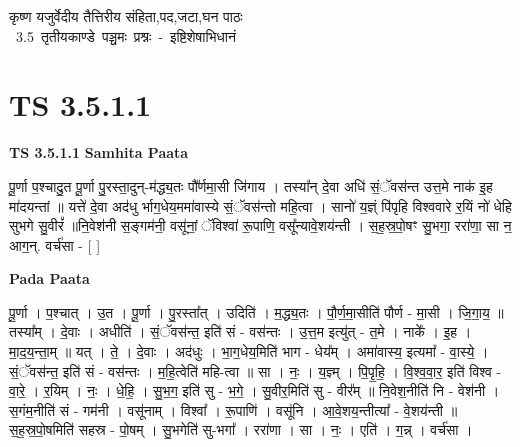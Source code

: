 \documentclass[17pt]{extarticle}
\begin{document}
\begin{titlepage}
    \begin{center}
 
\begin{sanskrit}
    { \Huge
    कृष्ण यजुर्वेदीय तैत्तिरीय संहिता,पद,जटा,घन पाठः 
    }
    \\
    \vspace{2.5cm}
    \mbox{ \Huge
    3.5      तृतीयकाण्डे पञ्चमः प्रश्नः - इष्टिशेषाभिधानं   }
\end{sanskrit}
\end{center}

\end{titlepage}
\tableofcontents
\pagebreak

\section*{ TS 3.5.1.1 }

\textbf{TS 3.5.1.1 } \newline
\textbf{Samhita Paata} \newline

पू॒र्णा प॒श्चादु॒त पू॒र्णा पु॒रस्ता॒दुन्-म॑द्ध्य॒तः पौ᳚र्णमा॒सी जि॑गाय । तस्या᳚न् दे॒वा अधि॑ सं॒ॅवस॑न्त उत्त॒मे नाक॑ इ॒ह मा॑दयन्तां ॥ यत्ते॑ दे॒वा अद॑धु र्भाग॒धेय॒ममा॑वास्ये सं॒ॅवस॑न्तो महि॒त्वा । सानो॑ य॒ज्ञ्ं पि॑पृहि विश्ववारे र॒यिं नो॑ धेहि सुभगे सु॒वीरं᳚ ॥नि॒वेश॑नी स॒ङ्गम॑नी॒ वसू॑नां॒ ॅविश्वा॑ रू॒पाणि॒ वसू᳚न्यावे॒शय॑न्ती । स॒ह॒स्र॒पो॒षꣳ सु॒भगा॒ ररा॑णा॒ सा न॒ आग॒न्. वर्च॑सा - [  ] \newline

\textbf{Pada Paata} \newline

पू॒र्णा । प॒श्चात् । उ॒त । पू॒र्णा । पु॒रस्ता᳚त् । उदिति॑ । म॒द्ध्य॒तः । पौ॒र्ण॒मा॒सीति॑ पौर्ण - मा॒सी । जि॒गा॒य॒ ॥ तस्या᳚म् । दे॒वाः । अधीति॑ । सं॒ॅवस॑न्त॒ इति॑ सं - वस॑न्तः । उ॒त्त॒म इत्यु॑त् - त॒मे । नाके᳚ । इ॒ह । मा॒द॒य॒न्ता॒म् ॥ यत् । ते॒ । दे॒वाः । अद॑धुः । भा॒ग॒धेय॒मिति॑ भाग - धेय᳚म् । अमा॑वास्य॒ इत्यमा᳚ - वा॒स्ये॒ । सं॒ॅवस॑न्त॒ इति॑ सं - वस॑न्तः । म॒हि॒त्वेति॑ महि-त्वा ॥ सा । नः॒ । य॒ज्ञ्म् । पि॒पृ॒हि॒ । वि॒श्व॒वा॒र॒ इति॑ विश्व - वा॒रे॒ । र॒यिम् । नः॒ । धे॒हि॒ । सु॒भ॒ग॒ इति॑ सु - भ॒गे॒ । सु॒वीर॒मिति॑ सु - वीर᳚म् ॥ नि॒वेश॒नीति॑ नि - वेश॑नी । स॒गंम॒नीति॑ सं - गम॑नी । वसू॑नाम् । विश्वा᳚ । रू॒पाणि॑ । वसू॑नि । आ॒वे॒शय॒न्तीत्या᳚ - वे॒शय॑न्ती ॥ स॒ह॒स्र॒पो॒षमिति॑ सहस्र - पो॒षम् । सु॒भगेति॑ सु-भगा᳚ । ररा॑णा । सा । नः॒ । एति॑ । ग॒न्न् । वर्च॑सा ।  \newline
\end{document}
